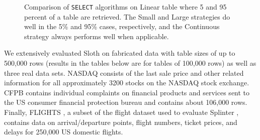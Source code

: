 \documentclass[USenglish,oneside,twocolumn]{article}
\def\name/{Sloth}
\begin{document}
\begin{figure}
\vskip 10pt

\caption{Comparison of \texttt{SELECT} algorithms on Linear table where 5 and 95 percent of a table are retrieved. The Small and Large strategies do well in the 5\% and 95\% cases, respectively, and the Continuous strategy always performs well when applicable.} 
\label{figC3}
\end{figure}

We extensively evaluated \name/ on fabricated data with table sizes of up to 500,000 rows (results in the tables below are for tables of 100,000 rows) as well as three real data sets. NASDAQ \cite{NASDAQ} consists of the last sale price and other related information for all approximately 3200 stocks on the NASDAQ stock exchange. CFPB \cite{CFPB} contains individual complaints on financial products and services sent to the US consumer financial protection bureau and contains about 106,000 rows. Finally, FLIGHTS \cite{FLIGHT}, a subset of the flight dataset used to evaluate Splinter \cite{WYG+17}, contains data on arrival/departure points, flight numbers, ticket prices, and delays for 250,000 US domestic flights. 
\end{document}
